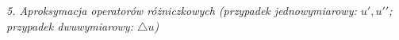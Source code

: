 \textit{5. Aproksymacja operatorów różniczkowych (przypadek jednowymiarowy: ${u}', {{u}'}'$; przypadek dwuwymiarowy: $\bigtriangleup u$)}